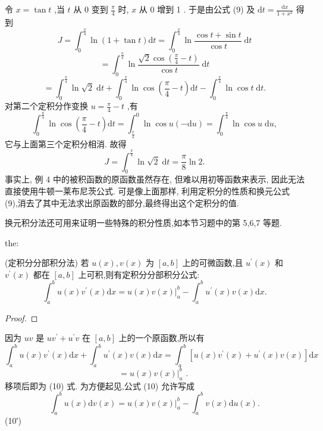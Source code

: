 \begin{solution}

\end{solution}
令 \(x = \tan t\) ,当 \(t\) 从 0 变到 \(\frac{\pi }{4}\) 时, \(x\) 从 0 增到 1 . 于是由公式 (9) 及 \(\mathrm{d}t = \frac{\mathrm{d}x}{1 + {x}^{2}}\) 得到
\[
J = {\int }_{0}^{\frac{\pi }{4}}\ln \left( {1 + \tan t}\right) \mathrm{d}t = {\int }_{0}^{\frac{\pi }{4}}\ln \frac{\cos t + \sin t}{\cos t}\mathrm{\;d}t
\]
\[
= {\int }_{0}^{\frac{\pi }{4}}\ln \frac{\sqrt{2}\cos \left( {\frac{\pi }{4} - t}\right) }{\cos t}\mathrm{\;d}t
\]
\[
= {\int }_{0}^{\frac{\pi }{4}}\ln \sqrt{2}\mathrm{\;d}t + {\int }_{0}^{\frac{\pi }{4}}\ln \cos \left( {\frac{\pi }{4} - t}\right) \mathrm{d}t - {\int }_{0}^{\frac{\pi }{4}}\ln \cos t\mathrm{\;d}t.
\]
对第二个定积分作变换 \(u = \frac{\pi }{4} - t\) ,有
\[
{\int }_{0}^{\frac{\pi }{4}}\ln \cos \left( {\frac{\pi }{4} - t}\right) \mathrm{d}t = {\int }_{\frac{\pi }{4}}^{0}\ln \cos u\left( {-\mathrm{d}u}\right)  = {\int }_{0}^{\frac{\pi }{4}}\ln \cos u\mathrm{\;d}u,
\]
它与上面第三个定积分相消. 故得
\[
J = {\int }_{0}^{\frac{\pi }{4}}\ln \sqrt{2}\mathrm{\;d}t = \frac{\pi }{8}\ln 2.
\]
事实上, 例 4 中的被积函数的原函数虽然存在, 但难以用初等函数来表示, 因此无法直接使用牛顿一莱布尼茨公式. 可是像上面那样, 利用定积分的性质和换元公式 (9),消去了其中无法求出原函数的部分,最终得出这个定积分的值.

换元积分法还可用来证明一些特殊的积分性质,如本节习题中的第 5,6,7 等题.

\begin{theorem}{}{the:}

\end{theorem}
 (定积分分部积分法) 若 \(u\left( x\right) ,v\left( x\right)\) 为 \(\left\lbrack  {a,b}\right\rbrack\) 上的可微函数,且 \({u}^{\prime }\left( x\right)\) 和 \({v}^{\prime }\left( x\right)\) 都在 \(\left\lbrack  {a,b}\right\rbrack\) 上可积,则有定积分分部积分公式:
\[
{\int }_{a}^{b}u\left( x\right) {v}^{\prime }\left( x\right) \mathrm{d}x = {\left. u\left( x\right) v\left( x\right) \right| }_{a}^{b} - {\int }_{a}^{b}{u}^{\prime }\left( x\right) v\left( x\right) \mathrm{d}x. \tag{10}
\]
\begin{proof}

\end{proof}
因为 \({uv}\) 是 \(u{v}^{\prime } + {u}^{\prime }v\) 在 \(\left\lbrack  {a,b}\right\rbrack\) 上的一个原函数,所以有
\[
{\int }_{a}^{b}u\left( x\right) {v}^{\prime }\left( x\right) \mathrm{d}x + {\int }_{a}^{b}{u}^{\prime }\left( x\right) v\left( x\right) \mathrm{d}x = {\int }_{a}^{b}\left\lbrack  {u\left( x\right) {v}^{\prime }\left( x\right)  + {u}^{\prime }\left( x\right) v\left( x\right) }\right\rbrack  \mathrm{d}x
\]
\[
= {\left. u\left( x\right) v\left( x\right) \right| }_{a}^{b}\text{ . }
\]
移项后即为 (10) 式. 为方便起见,公式 (10) 允许写成
\[
{\int }_{a}^{b}u\left( x\right) \mathrm{d}v\left( x\right)  = {\left. u\left( x\right) v\left( x\right) \right| }_{a}^{b} - {\int }_{a}^{b}v\left( x\right) \mathrm{d}u\left( x\right) .
\]
 (10′)

